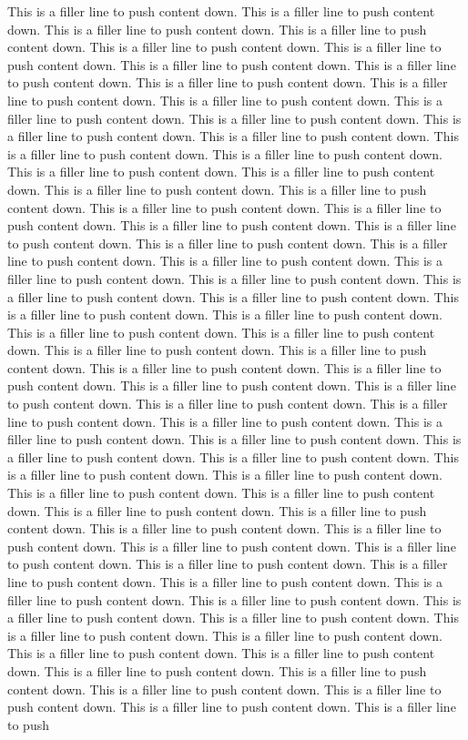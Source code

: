 \documentclass[11pt,a4paper]{report}
\begin{document}
This is a filler line to push content down. This is a filler line to push content down. This is a filler line to push content down. This is a filler line to push content down. This is a filler line to push content down. This is a filler line to push content down. This is a filler line to push content down. This is a filler line to push content down. This is a filler line to push content down. This is a filler line to push content down. This is a filler line to push content down. This is a filler line to push content down. This is a filler line to push content down. This is a filler line to push content down. This is a filler line to push content down. This is a filler line to push content down. This is a filler line to push content down. This is a filler line to push content down. This is a filler line to push content down. This is a filler line to push content down. This is a filler line to push content down. This is a filler line to push content down. This is a filler line to push content down. This is a filler line to push content down. This is a filler line to push content down. This is a filler line to push content down. This is a filler line to push content down. This is a filler line to push content down. This is a filler line to push content down. This is a filler line to push content down. This is a filler line to push content down. This is a filler line to push content down. This is a filler line to push content down. This is a filler line to push content down. This is a filler line to push content down. This is a filler line to push content down. This is a filler line to push content down. This is a filler line to push content down. This is a filler line to push content down. This is a filler line to push content down. This is a filler line to push content down. This is a filler line to push content down. This is a filler line to push content down. This is a filler line to push content down. This is a filler line to push content down. This is a filler line to push content down. This is a filler line to push content down. This is a filler line to push content down. This is a filler line to push content down. This is a filler line to push content down. This is a filler line to push content down. This is a filler line to push content down. This is a filler line to push content down. This is a filler line to push content down. This is a filler line to push content down. This is a filler line to push content down. This is a filler line to push content down. This is a filler line to push content down. This is a filler line to push content down. This is a filler line to push content down. This is a filler line to push content down. This is a filler line to push content down. This is a filler line to push content down. This is a filler line to push content down. This is a filler line to push content down. This is a filler line to push content down. This is a filler line to push content down. This is a filler line to push content down. This is a filler line to push content down. This is a filler line to push content down. This is a filler line to push content down. This is a filler line to push content down. This is a filler line to push content down. This is a filler line to push content down. This is a filler line to push content down. This is a filler line to push 
\end{document}
